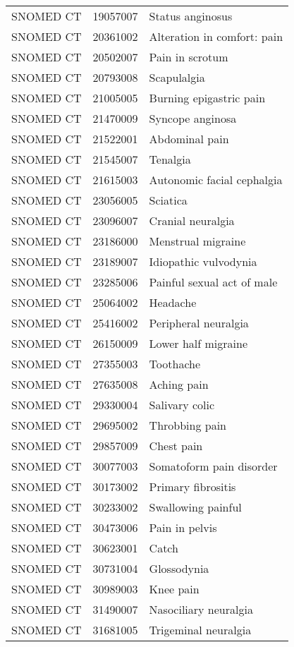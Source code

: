 \begin{longtable}{p{}p{}p{}}
  SNOMED CT & 19057007 & Status anginosus \\ 
  SNOMED CT & 20361002 & Alteration in comfort: pain \\ 
  SNOMED CT & 20502007 & Pain in scrotum \\ 
  SNOMED CT & 20793008 & Scapulalgia \\ 
  SNOMED CT & 21005005 & Burning epigastric pain \\ 
  SNOMED CT & 21470009 & Syncope anginosa \\ 
  SNOMED CT & 21522001 & Abdominal pain \\ 
  SNOMED CT & 21545007 & Tenalgia \\ 
  SNOMED CT & 21615003 & Autonomic facial cephalgia \\ 
  SNOMED CT & 23056005 & Sciatica \\ 
  SNOMED CT & 23096007 & Cranial neuralgia \\ 
  SNOMED CT & 23186000 & Menstrual migraine \\ 
  SNOMED CT & 23189007 & Idiopathic vulvodynia \\ 
  SNOMED CT & 23285006 & Painful sexual act of male \\ 
  SNOMED CT & 25064002 & Headache \\ 
  SNOMED CT & 25416002 & Peripheral neuralgia \\ 
  SNOMED CT & 26150009 & Lower half migraine \\ 
  SNOMED CT & 27355003 & Toothache \\ 
  SNOMED CT & 27635008 & Aching pain \\ 
  SNOMED CT & 29330004 & Salivary colic \\ 
  SNOMED CT & 29695002 & Throbbing pain \\ 
  SNOMED CT & 29857009 & Chest pain \\ 
  SNOMED CT & 30077003 & Somatoform pain disorder \\ 
  SNOMED CT & 30173002 & Primary fibrositis \\ 
  SNOMED CT & 30233002 & Swallowing painful \\ 
  SNOMED CT & 30473006 & Pain in pelvis \\ 
  SNOMED CT & 30623001 & Catch \\ 
  SNOMED CT & 30731004 & Glossodynia \\ 
  SNOMED CT & 30989003 & Knee pain \\ 
  SNOMED CT & 31490007 & Nasociliary neuralgia \\ 
  SNOMED CT & 31681005 & Trigeminal neuralgia \\ 

\end{longtable}
